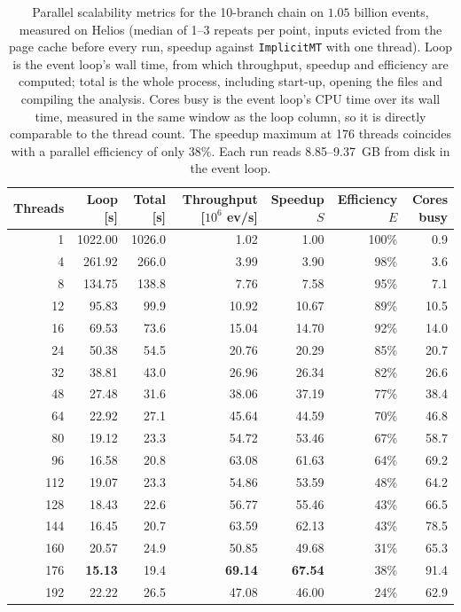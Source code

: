 \begin{table}[htbp]
\centering
\caption{Parallel scalability metrics for the 10-branch chain on $1.05$ billion events, measured on Helios (median of 1--3 repeats per point, inputs evicted from the page cache before every run, speedup against \texttt{ImplicitMT} with one thread). Loop is the event loop's wall time, from which throughput, speedup and efficiency are computed; total is the whole process, including start-up, opening the files and compiling the analysis. Cores busy is the event loop's CPU time over its wall time, measured in the same window as the loop column, so it is directly comparable to the thread count. The speedup maximum at 176 threads coincides with a parallel efficiency of only $38\%$. Each run reads 8.85--9.37~GB from disk in the event loop.}
\label{tab:scalability-chain11}
\setlength{\tabcolsep}{5pt}
\begin{tabular}{rrrrrrr}
\toprule
Threads & Loop [s] & Total [s] & Throughput [$10^6$ ev/s] & Speedup $S$ & Efficiency $E$ & Cores busy \\
\midrule
 1 & 1022.00 & 1026.0 & 1.02 & 1.00 & 100\% & 0.9 \\
 4 & 261.92 & 266.0 & 3.99 & 3.90 & 98\% & 3.6 \\
 8 & 134.75 & 138.8 & 7.76 & 7.58 & 95\% & 7.1 \\
12 & 95.83 & 99.9 & 10.92 & 10.67 & 89\% & 10.5 \\
16 & 69.53 & 73.6 & 15.04 & 14.70 & 92\% & 14.0 \\
24 & 50.38 & 54.5 & 20.76 & 20.29 & 85\% & 20.7 \\
32 & 38.81 & 43.0 & 26.96 & 26.34 & 82\% & 26.6 \\
48 & 27.48 & 31.6 & 38.06 & 37.19 & 77\% & 38.4 \\
64 & 22.92 & 27.1 & 45.64 & 44.59 & 70\% & 46.8 \\
80 & 19.12 & 23.3 & 54.72 & 53.46 & 67\% & 58.7 \\
96 & 16.58 & 20.8 & 63.08 & 61.63 & 64\% & 69.2 \\
112 & 19.07 & 23.3 & 54.86 & 53.59 & 48\% & 64.2 \\
128 & 18.43 & 22.6 & 56.77 & 55.46 & 43\% & 66.5 \\
144 & 16.45 & 20.7 & 63.59 & 62.13 & 43\% & 78.5 \\
160 & 20.57 & 24.9 & 50.85 & 49.68 & 31\% & 65.3 \\
176 & \textbf{15.13} & 19.4 & \textbf{69.14} & \textbf{67.54} & 38\% & 91.4 \\
192 & 22.22 & 26.5 & 47.08 & 46.00 & 24\% & 62.9 \\
\bottomrule
\end{tabular}
\end{table}
